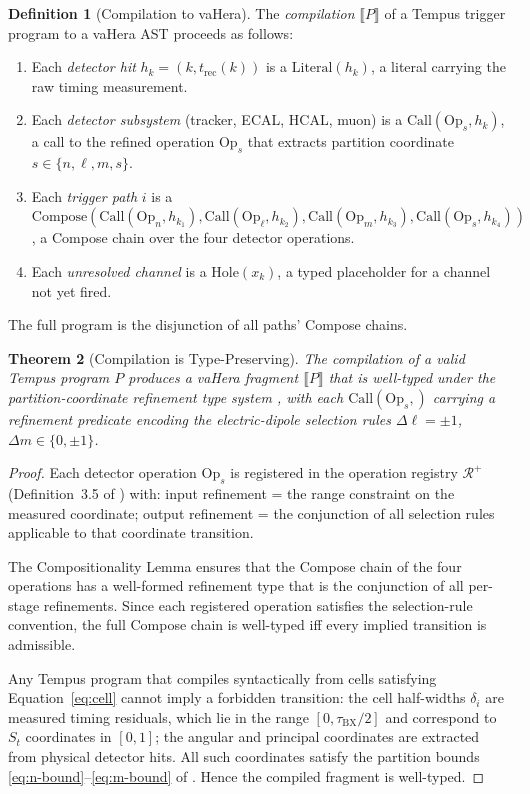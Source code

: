 \documentclass[twocolumn,10pt,a4paper]{article}
\theoremstyle{thmstyle}
\newtheorem{theorem}{Theorem}[section]
\theoremstyle{definition}
\newtheorem{definition}[theorem]{Definition}
\theoremstyle{remark}
\newcommand{\tBX}{\tau_{\mathrm{BX}}}
\newcommand{\vLit}[1]{\mathrm{Literal}(#1)}
\newcommand{\vCall}[2]{\mathrm{Call}(#1,#2)}
\newcommand{\vComp}[1]{\mathrm{Compose}(#1)}
\newcommand{\vHol}[1]{\mathrm{Hole}(#1)}
\newcommand{\Reg}{\mathcal{R}}
\begin{document}
\begin{definition}[Compilation to vaHera]
\label{def:compilation}
The \emph{compilation} $\llbracket P \rrbracket$ of a Tempus trigger
program to a vaHera AST proceeds as follows:
\begin{enumerate}[nosep,label=(\roman*)]
\item Each \emph{detector hit} $h_k = (k, t_{\mathrm{rec}}(k))$ is a
  $\vLit{h_k}$, a literal carrying the raw timing measurement.
\item Each \emph{detector subsystem} (tracker, ECAL, HCAL, muon) is a
  $\vCall{\mathrm{Op}_s}{h_k}$, a call to the refined operation
  $\mathrm{Op}_s$ that extracts partition coordinate $s \in \{n,\ell,m,s\}$.
\item Each \emph{trigger path} $i$ is a
  $\vComp{\vCall{\mathrm{Op}_n}{h_{k_1}},
           \vCall{\mathrm{Op}_\ell}{h_{k_2}},
           \vCall{\mathrm{Op}_m}{h_{k_3}},
           \vCall{\mathrm{Op}_s}{h_{k_4}}}$,
  a Compose chain over the four detector operations.
\item Each \emph{unresolved channel} is a $\vHol{x_k}$, a typed placeholder
  for a channel not yet fired.
\end{enumerate}
The full program is the disjunction of all paths' Compose chains.
\end{definition}

\begin{theorem}[Compilation is Type-Preserving]
\label{thm:compilation}
The compilation of a valid Tempus program $P$ produces a vaHera fragment
$\llbracket P \rrbracket$ that is well-typed under the partition-coordinate
refinement type system \citep{companion:types}, with each $\vCall{\mathrm{Op}_s}{}$
carrying a refinement predicate encoding the electric-dipole selection rules
$\Delta\ell = \pm 1$, $\Delta m \in \{0,\pm 1\}$.
\end{theorem}

\begin{proof}
Each detector operation $\mathrm{Op}_s$ is registered in the operation
registry $\Reg^+$ (Definition~3.5 of \citealt{companion:types}) with:
input refinement = the range constraint on the measured coordinate;
output refinement = the conjunction of all selection rules applicable to
that coordinate transition.

The Compositionality Lemma \citep{companion:types} ensures that the
Compose chain of the four operations has a well-formed refinement type
that is the conjunction of all per-stage refinements. Since each registered
operation satisfies the selection-rule convention, the full Compose chain
is well-typed iff every implied transition is admissible.

Any Tempus program that compiles syntactically from cells satisfying
Equation~\eqref{eq:cell} cannot imply a forbidden transition: the cell
half-widths $\delta_i$ are measured timing residuals, which lie in the
range $[0, \tBX/2]$ and correspond to $S_t$ coordinates in $[0,1]$; the
angular and principal coordinates are extracted from physical detector
hits. All such coordinates satisfy the partition bounds
\eqref{eq:n-bound}--\eqref{eq:m-bound} of \citet{companion:types}.
Hence the compiled fragment is well-typed.
\end{proof}
\end{document}
